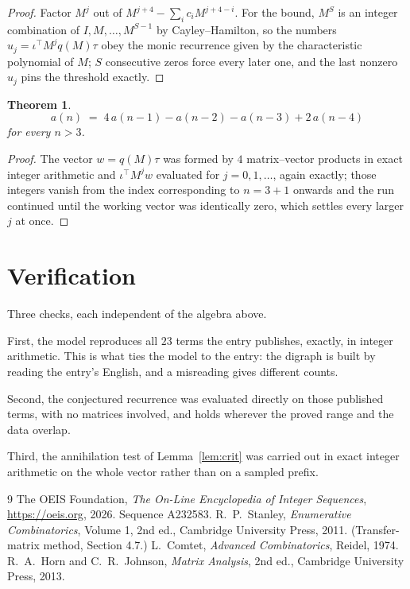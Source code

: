 \documentclass[11pt,a4paper]{article}
\theoremstyle{plain}
\newtheorem{theorem}{Theorem}
\theoremstyle{definition}
\begin{document}
\begin{proof}
Factor $M^{j}$ out of $M^{j+4}-\sum_ic_iM^{j+4-i}$. For the bound, $M^{S}$
is an integer combination of $I,M,\dots,M^{S-1}$ by Cayley--Hamilton, so the numbers
$u_j=\iota^{\!\top}M^{j}q(M)\tau$ obey the monic recurrence given by the characteristic
polynomial of $M$; $S$ consecutive zeros force every later one, and the last nonzero $u_j$
pins the threshold exactly.
\end{proof}

\begin{theorem}
\[
a(n)\;=\;4\,a(n-1) - a(n-2) - a(n-3) + 2\,a(n-4)
\]
for every $n>3$.
\end{theorem}

\begin{proof}
The vector $w=q(M)\tau$ was formed by $4$ matrix--vector products in exact integer
arithmetic and $\iota^{\!\top}M^{j}w$ evaluated for $j=0,1,\dots$, again exactly; those
integers vanish from the index corresponding to $n=3+1$ onwards and the run continued
until the working vector was identically zero, which settles every larger $j$ at once.
\end{proof}

\section{Verification}

Three checks, each independent of the algebra above.

First, the model reproduces all $23$ terms the entry publishes, exactly, in integer
arithmetic. This is what ties the model to the entry: the digraph is built by reading the
entry's English, and a misreading gives different counts.

Second, the conjectured recurrence was evaluated directly on those published terms, with no
matrices involved, and holds wherever the proved range and the data overlap.

Third, the annihilation test of Lemma~\ref{lem:crit} was carried out in exact integer
arithmetic on the whole vector rather than on a sampled prefix.

\begin{thebibliography}{9}
 The OEIS Foundation, \emph{The On-Line Encyclopedia of Integer
Sequences}, \url{https://oeis.org}, 2026. Sequence A232583.
 R.~P.~Stanley, \emph{Enumerative Combinatorics}, Volume 1, 2nd ed.,
Cambridge University Press, 2011. (Transfer-matrix method, Section 4.7.)
 L.~Comtet, \emph{Advanced Combinatorics}, Reidel, 1974.
 R.~A.~Horn and C.~R.~Johnson, \emph{Matrix Analysis}, 2nd ed., Cambridge
University Press, 2013.
\end{thebibliography}
\end{document}
